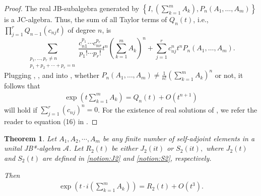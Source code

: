 \documentclass{article}
\theoremstyle{plain} %
\newtheorem{thm}{Theorem}[section]
\newtheorem{rmk}[thm]{Remark}
\numberwithin{equation}{section}
\begin{document}
\begin{proof}
The real JB-subalgebra generated by $\displaystyle \left\{I, \left(\sum_{k=1}^m A_k\right), P_n(A_1,\dots, A_m)\right\}$ is a JC-algebra. Thus, the sum of all Taylor terms of $Q_n(t)$, i.e., $\displaystyle \prod_{j=1}^r Q_{n-1}(c_{nj} t)$ of degree $n$, is
\begin{equation}\label{eqt:taylor:approximate n}
 \sum_{\substack{p_1, \dots, p_r \neq n \\ p_1 + p_2 + \cdots + p_r = n}} \frac{c_{n1}^{p_1} \cdots c_{nr}^{p_r}}{p_1! \cdots p_r!} t^n \left(\sum_{k=1}^m A_k\right)^n + \sum_{j=1}^r c_{nj}^n t^n P_n(A_1, \dots, A_m).	 
\end{equation}
Plugging  , , and  into , 
whether 
$\displaystyle P_n(A_1, \dots, A_m) \neq \frac{1}{n!}\left(\sum_{k=1}^m A_k\right)^n$
or not,  
it follows that 
\begin{align*}
    \exp\left(t\sum_{k=1}^m A_k\right) = Q_n(t) + O(t^{n+1}) 
\end{align*}
will hold if $\displaystyle 
    \sum_{j=1}^r (c_{nj})^n = 0$.
For the existence of real solutions of , we refer the reader to equation (16) in \cite{suzuki:1990:fractal}.
\end{proof}
\fi 

\iffalse 
\begin{thm}\label{thm:Trotter:two:unitary:JB*}
 Let $A_1, A_2,\cdots, A_m$ be any finite number of self-adjoint elements in a unital JB*-algebra $\mathcal{A}$. Let  $R_2(t)$ be either $J_2(i t)$ or $S_2(i t),$  where $J_2(t)$ and $S_2(t)$ are defined in \cref{notion:J2} and \cref{notion:S2}, respectively. 

Then 
\begin{align*}
\exp\left(t\cdot i\left(\sum_{k=1}^m A_k\right)\right)=R_{2}(t)+O(t^3). 
\end{align*}
\end{thm}
\end{document}
